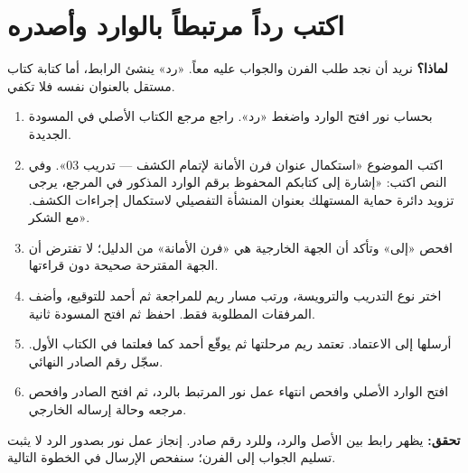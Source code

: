\section{اكتب رداً مرتبطاً بالوارد وأصدره}
\label{sec:reply}
\textbf{لماذا؟} نريد أن نجد طلب الفرن والجواب عليه معاً. «رد» ينشئ الرابط، أما كتابة كتاب مستقل بالعنوان نفسه فلا تكفي.
\begin{enumerate}
\item بحساب نور افتح الوارد واضغط «رد». راجع مرجع الكتاب الأصلي في المسودة الجديدة.
\item اكتب الموضوع «استكمال عنوان فرن الأمانة لإتمام الكشف — تدريب 03». وفي النص اكتب: «إشارة إلى كتابكم المحفوظ برقم الوارد المذكور في المرجع، يرجى تزويد دائرة حماية المستهلك بعنوان المنشأة التفصيلي لاستكمال إجراءات الكشف. مع الشكر».
\item افحص «إلى» وتأكد أن الجهة الخارجية هي «فرن الأمانة» من الدليل؛ لا تفترض أن الجهة المقترحة صحيحة دون قراءتها.
\item اختر نوع التدريب والترويسة، ورتب مسار ريم للمراجعة ثم أحمد للتوقيع، وأضف المرفقات المطلوبة فقط. احفظ ثم افتح المسودة ثانية.
\item أرسلها إلى الاعتماد. تعتمد ريم مرحلتها ثم يوقّع أحمد كما فعلتما في الكتاب الأول. سجّل رقم الصادر النهائي.
\item افتح الوارد الأصلي وافحص انتهاء عمل نور المرتبط بالرد، ثم افتح الصادر وافحص مرجعه وحالة إرساله الخارجي.
\end{enumerate}
\textbf{تحقق:} يظهر رابط بين الأصل والرد، وللرد رقم صادر. إنجاز عمل نور بصدور الرد لا يثبت تسليم الجواب إلى الفرن؛ سنفحص الإرسال في الخطوة التالية.

